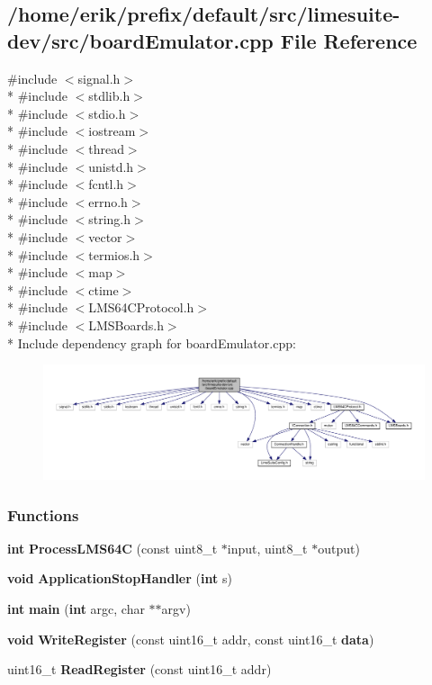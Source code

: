 \subsection{/home/erik/prefix/default/src/limesuite-\/dev/src/board\+Emulator.cpp File Reference}
\label{boardEmulator_8cpp}
{\ttfamily \#include $<$signal.\+h$>$}\\*
{\ttfamily \#include $<$stdlib.\+h$>$}\\*
{\ttfamily \#include $<$stdio.\+h$>$}\\*
{\ttfamily \#include $<$iostream$>$}\\*
{\ttfamily \#include $<$thread$>$}\\*
{\ttfamily \#include $<$unistd.\+h$>$}\\*
{\ttfamily \#include $<$fcntl.\+h$>$}\\*
{\ttfamily \#include $<$errno.\+h$>$}\\*
{\ttfamily \#include $<$string.\+h$>$}\\*
{\ttfamily \#include $<$vector$>$}\\*
{\ttfamily \#include $<$termios.\+h$>$}\\*
{\ttfamily \#include $<$map$>$}\\*
{\ttfamily \#include $<$ctime$>$}\\*
{\ttfamily \#include $<$L\+M\+S64\+C\+Protocol.\+h$>$}\\*
{\ttfamily \#include $<$L\+M\+S\+Boards.\+h$>$}\\*
Include dependency graph for board\+Emulator.\+cpp\+:
\nopagebreak
\begin{figure}[H]
\begin{center}
\leavevmode
\includegraphics[width=350pt]{db/de1/boardEmulator_8cpp__incl}
\end{center}
\end{figure}
\subsubsection*{Functions}
\begin{DoxyCompactItemize}
\item 
{\bf int} {\bf Process\+L\+M\+S64C} (const uint8\+\_\+t $\ast$input, uint8\+\_\+t $\ast$output)
\item 
{\bf void} {\bf Application\+Stop\+Handler} ({\bf int} s)
\item 
{\bf int} {\bf main} ({\bf int} argc, char $\ast$$\ast$argv)
\item 
{\bf void} {\bf Write\+Register} (const uint16\+\_\+t addr, const uint16\+\_\+t {\bf data})
\item 
uint16\+\_\+t {\bf Read\+Register} (const uint16\+\_\+t addr)
\end{DoxyCompactItemize}
